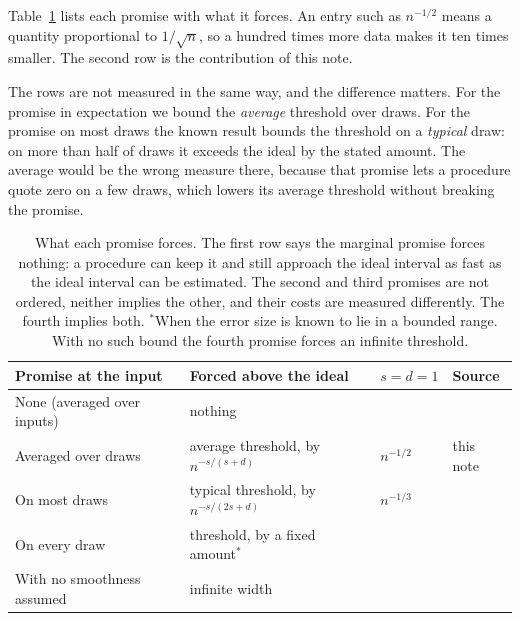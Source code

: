 \documentclass[11pt]{article}
\theoremstyle{definition}
\theoremstyle{remark}
\begin{document}
Table~\ref{tab:prices} lists each promise with what it forces. An entry such as $n^{-1/2}$
means a quantity proportional to $1/\sqrt n$, so a hundred times more data makes it ten
times smaller. The second row is the contribution of this note.

The rows are not measured in the same way, and the difference matters. For the promise in
expectation we bound the \emph{average} threshold over draws. For the promise on most draws
the known result bounds the threshold on a \emph{typical} draw: on more than half of draws
it exceeds the ideal by the stated amount. The average would be the wrong measure there,
because that promise lets a procedure quote zero on a few draws, which lowers its average
threshold without breaking the promise.

\begin{table}[h]
\centering\small\setlength{\tabcolsep}{4pt}
\begin{tabular}{llll}
\toprule
Promise at the input & Forced above the ideal & $s=d=1$ & Source \\
\midrule
None (averaged over inputs) & nothing & & \citet{lei2014distribution} \\
Averaged over draws & average threshold, by $n^{-s/(s+d)}$ & $n^{-1/2}$ &
  this note \\
On most draws & typical threshold, by $n^{-s/(2s+d)}$ & $n^{-1/3}$ &
  \citet{cotton2026honest} \\
On every draw & threshold, by a fixed amount$^{*}$ & & \citet{cotton2026honest} \\
With no smoothness assumed & infinite width & & \citet{barber2021limits} \\
\bottomrule
\end{tabular}
\caption{What each promise forces. The first row says the marginal promise forces nothing: a
procedure can keep it and still approach the ideal interval as fast as the ideal interval
can be estimated. The second and third promises are not ordered, neither implies the other,
and their costs are measured differently. The fourth implies both. $^{*}$When the error
size is known to lie in a bounded range. With no such bound the fourth promise forces an
infinite threshold.}
\label{tab:prices}
\end{table}
\end{document}
